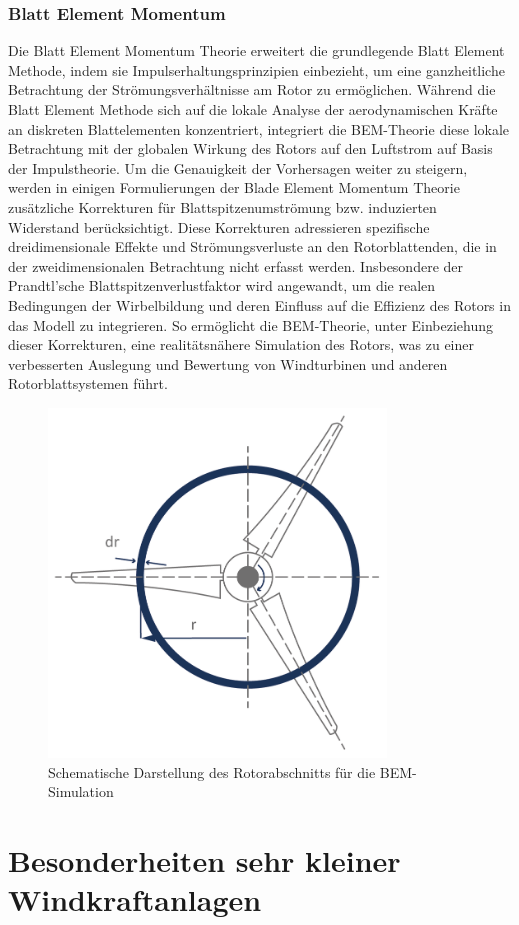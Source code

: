 \subsubsection{Blatt Element Momentum}
Die Blatt Element Momentum Theorie erweitert die grundlegende Blatt Element Methode, indem sie Impulserhaltungsprinzipien einbezieht, um eine ganzheitliche Betrachtung der Strömungsverhältnisse am Rotor zu ermöglichen. Während die Blatt Element Methode sich auf die lokale Analyse der aerodynamischen Kräfte an diskreten Blattelementen konzentriert, integriert die BEM-Theorie diese lokale Betrachtung mit der globalen Wirkung des Rotors auf den Luftstrom auf Basis der Impulstheorie.\cite{branlard_wind_2017}
Um die Genauigkeit der Vorhersagen weiter zu steigern, werden in einigen Formulierungen der Blade Element Momentum Theorie zusätzliche Korrekturen für Blattspitzenumströmung bzw. induzierten Widerstand berücksichtigt. Diese Korrekturen adressieren spezifische dreidimensionale Effekte und Strömungsverluste an den Rotorblattenden, die in der zweidimensionalen Betrachtung nicht erfasst werden. Insbesondere der Prandtl'sche Blattspitzenverlustfaktor wird angewandt, um die realen Bedingungen der Wirbelbildung und deren Einfluss auf die Effizienz des Rotors in das Modell zu integrieren. So ermöglicht die BEM-Theorie, unter Einbeziehung dieser Korrekturen, eine realitätsnähere Simulation des Rotors, was zu einer verbesserten Auslegung und Bewertung von Windturbinen und anderen Rotorblattsystemen führt. \cite{noauthor_blade_nodate}

\begin{figure}[h]
\centering
\includegraphics[width=0.8\textwidth]{figures/ringschnitt_rotor.png}
\caption{Schematische Darstellung des Rotorabschnitts für die BEM-Simulation \cite{noauthor_aerodynamik_nodate}}
\label{fig:ringschnitt}
\end{figure}

\section{Besonderheiten sehr kleiner Windkraftanlagen}